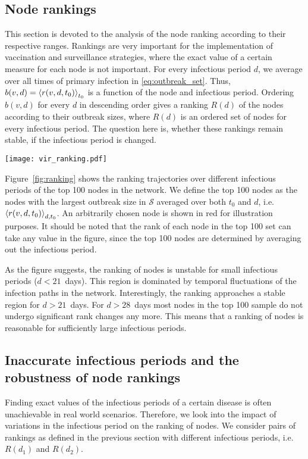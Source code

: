 \subsection{Node rankings}
This section is devoted to the analysis of the node ranking according to their respective ranges.
Rankings are very important for the implementation of vaccination and surveillance strategies, where the exact value of a certain measure for each node is not important.
For every infectious period $d$, we average over all times of primary infection in \eqref{eq:outbreak_set}.
Thus, $b(v,d)=\left< r(v,d,t_0) \right>_{t_0}$ is a function of the node and infectious period.
Ordering $b(v,d)$ for every $d$ in descending order gives a ranking $R(d)$ of the nodes according to their outbreak sizes, where $R(d)$ is an ordered set of nodes for every infectious period.
The question here is, whether these rankings remain stable, if the infectious period is changed.
%
\begin{SCfigure}
\texttt{[image: vir\_ranking.pdf]}
\caption{Node ranking of the top 100 nodes over different infectious periods.
Rankings are computed by averaging \eqref{eq:outbreak_set} over the time of primary infection.
Top 100 nodes are the nodes with the largest outbreak sizes averaged over $d$ and $t_0$.
The rankings of an arbitrary node are shown in red for illustration purposes.}
\label{fig:ranking}
\end{SCfigure}

Figure~\ref{fig:ranking} shows the ranking trajectories over different infectious periods of the top 100 nodes in the network. 
We define the top 100 nodes as the nodes with the largest outbreak size in $\mathcal{S}$ averaged over both $t_0$ and $d$, i.e. $\left< r(v,d,t_0) \right>_{d,t_0}$.
An arbitrarily chosen node is shown in red for illustration purposes.
It should be noted that the rank of each node in the top 100 set can take any value in the figure, since the top 100 nodes are determined by averaging out the infectious period.

As the figure suggests, the ranking of nodes is unstable for small infectious periods ($d<21$~days).
This region is dominated by temporal fluctuations of the infection paths in the network.
Interestingly, the ranking approaches a stable region for $d>21$~days.
For $d>28$~days most nodes in the top 100 sample do not undergo significant rank changes any more.
This means that a ranking of nodes is reasonable for sufficiently large infectious periods.

\subsection{Inaccurate infectious periods and the robustness of node rankings}
Finding exact values of the infectious periods of a certain disease is often unachievable in real world scenarios.
Therefore, we look into the impact of variations in the infectious period on the ranking of nodes.
We consider pairs of rankings as defined in the previous section with different infectious periods, i.e. $R(d_1)$ and $R(d_2)$.

